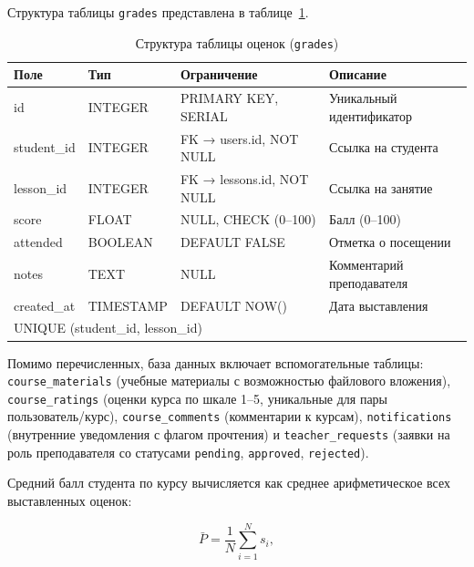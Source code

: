 Структура таблицы \texttt{grades} представлена в таблице~\ref{tab:db_grades}.

\begin{table}[ht!]
    \centering
    \caption{Структура таблицы оценок (\texttt{grades})}
    \label{tab:db_grades}
    \small
    \begin{tabularx}{\textwidth}{|p{3.0cm}|p{2.5cm}|p{3.5cm}|X|}
        \hline
        \textbf{Поле} & \textbf{Тип} & \textbf{Ограничение} & \textbf{Описание} \\ \hline
        id          & INTEGER   & PRIMARY KEY, SERIAL       & Уникальный идентификатор \\ \hline
        student\_id & INTEGER   & FK → users.id, NOT NULL   & Ссылка на студента \\ \hline
        lesson\_id  & INTEGER   & FK → lessons.id, NOT NULL & Ссылка на занятие \\ \hline
        score       & FLOAT     & NULL, CHECK (0--100)      & Балл (0--100) \\ \hline
        attended    & BOOLEAN   & DEFAULT FALSE             & Отметка о посещении \\ \hline
        notes       & TEXT      & NULL                      & Комментарий преподавателя \\ \hline
        created\_at & TIMESTAMP & DEFAULT NOW()             & Дата выставления \\ \hline
        \multicolumn{4}{|l|}{UNIQUE (student\_id, lesson\_id)} \\ \hline
    \end{tabularx}
\end{table}

Помимо перечисленных, база данных включает вспомогательные таблицы:
\texttt{course\_materials} (учебные материалы с возможностью файлового вложения),
\texttt{course\_ratings} (оценки курса по шкале 1--5, уникальные для пары
пользователь/курс), \texttt{course\_comments} (комментарии к курсам),
\texttt{notifications} (внутренние уведомления с флагом прочтения) и
\texttt{teacher\_requests} (заявки на роль преподавателя со статусами
\texttt{pending}, \texttt{approved}, \texttt{rejected}).

Средний балл студента по курсу вычисляется как среднее арифметическое
всех выставленных оценок:

\begin{equation}
    \bar{P} = \frac{1}{N} \sum_{i=1}^{N} s_i,
    \label{eq:avg_grade}
\end{equation}

